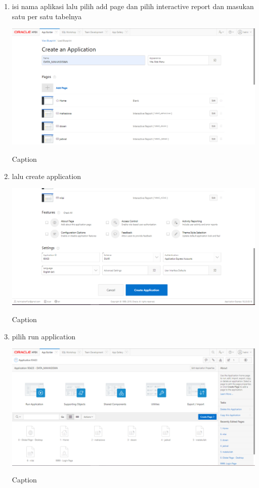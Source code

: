 ﻿\documentclass{article}
\begin{document}
\begin{enumerate}
                               \item isi nama aplikasi lalu pilih add page dan pilih interactive report dan masukan satu per satu tabelnya
    \begin{center}
        \centering
        \includegraphics[scale=0.4]{figures/14.PNG}
        \caption{Caption}
        \label{fig:my_label}
    \end{center}
    
                                   \item lalu create application
    \begin{center}
        \centering
        \includegraphics[scale=0.4]{figures/15.PNG}
        \caption{Caption}
        \label{fig:my_label}
    \end{center}
                                    \item pilih run application
    \begin{center}
        \centering
        \includegraphics[scale=0.4]{figures/16.PNG}
        \caption{Caption}
        \label{fig:my_label}
    \end{center}
    

\end{enumerate}
\end{document}

